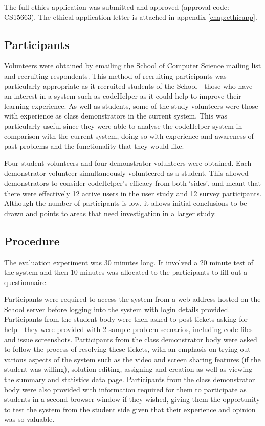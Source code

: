 The full ethics application was submitted and approved (approval code: CS15663). The ethical application letter is attached in appendix \ref{chap:ethicapp}.

\subsection{Participants}

Volunteers were obtained by emailing the School of Computer Science mailing list and recruiting respondents. This method of recruiting participants was particularly appropriate as it recruited students of the School - those who have an interest in a system such as codeHelper as it could help to improve their learning experience. As well as students, some of the study volunteers were those with experience as class demonstrators in the current system. This was particularly useful since they were able to analyse the codeHelper system in comparison with the current system, doing so with experience and awareness of past problems and the functionality that they would like. 

Four student volunteers and four demonstrator volunteers were obtained. Each demonstrator volunteer simultaneously volunteered as a student. This allowed demonstrators to consider codeHelper's efficacy from both `sides', and meant that there were effectively 12 active users in the user study and 12 survey participants. Although the number of participants is low, it allows initial conclusions to be drawn and points to areas that need investigation in a larger study.

\subsection{Procedure}

The evaluation experiment was 30 minutes long. It involved a 20 minute test of the system and then 10 minutes was allocated to the participants to fill out a questionnaire.

Participants were required to access the system from a web address hosted on the School server before logging into the system with login details provided. Participants from the student body were then asked to post tickets asking for help - they were provided with 2 sample problem scenarios, including code files and issue screenshots. Participants from the class demonstrator body were asked to follow the process of resolving these tickets, with an emphasis on trying out various aspects of the system such as the video and screen sharing features (if the student was willing), solution editing, assigning and creation as well as viewing the summary and statistics data page. Participants from the class demonstrator body were also provided with information required for them to participate as students in a second browser window if they wished, giving them the opportunity to test the system from the student side given that their experience and opinion was so valuable.

